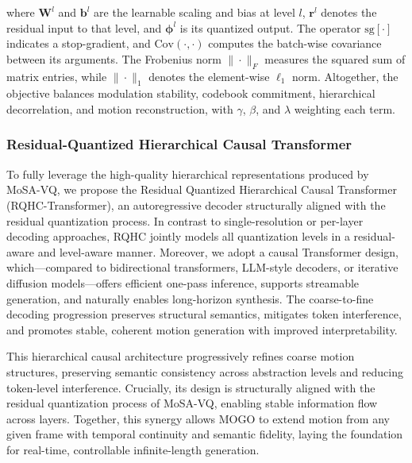 \documentclass[a4paper,12pt]{article}
\begin{document}
where $\mathbf{W}^l$ and $\mathbf{b}^l$ are the learnable scaling and bias at level $l$, 
$\mathbf{r}^l$ denotes the residual input to that level, and $\boldsymbol{\phi}^l$ is its quantized output. 
The operator $\mathrm{sg}[\cdot]$ indicates a stop-gradient, and $\mathrm{Cov}(\cdot,\cdot)$ computes the 
batch-wise covariance between its arguments. The Frobenius norm $\|\cdot\|_F$ measures the squared 
sum of matrix entries, while $\|\cdot\|_1$ denotes the element-wise $\ell_1$ norm. 
Altogether, the objective balances modulation stability, codebook commitment, hierarchical 
decorrelation, and motion reconstruction, with $\gamma$, $\beta$, and $\lambda$ weighting each term.

\subsubsection{Residual-Quantized Hierarchical Causal Transformer}
\label{sec:trainHMT}


To fully leverage the high-quality hierarchical representations produced by MoSA-VQ, we propose the Residual Quantized Hierarchical Causal Transformer (RQHC-Transformer), an autoregressive decoder structurally aligned with the residual quantization process. In contrast to single-resolution or per-layer decoding approaches, RQHC jointly models all quantization levels in a residual-aware and level-aware manner. Moreover, we adopt a causal Transformer design, which—compared to bidirectional transformers, LLM-style decoders, or iterative diffusion models—offers efficient one-pass inference, supports streamable generation, and naturally enables long-horizon synthesis. The coarse-to-fine decoding progression preserves structural semantics, mitigates token interference, and promotes stable, coherent motion generation with improved interpretability.

This hierarchical causal architecture progressively refines coarse motion structures, preserving semantic consistency across abstraction levels and reducing token-level interference. Crucially, its design is structurally aligned with the residual quantization process of MoSA-VQ, enabling stable information flow across layers. Together, this synergy allows MOGO to extend motion from any given frame with temporal continuity and semantic fidelity, laying the foundation for real-time, controllable infinite-length generation.
\end{document}
